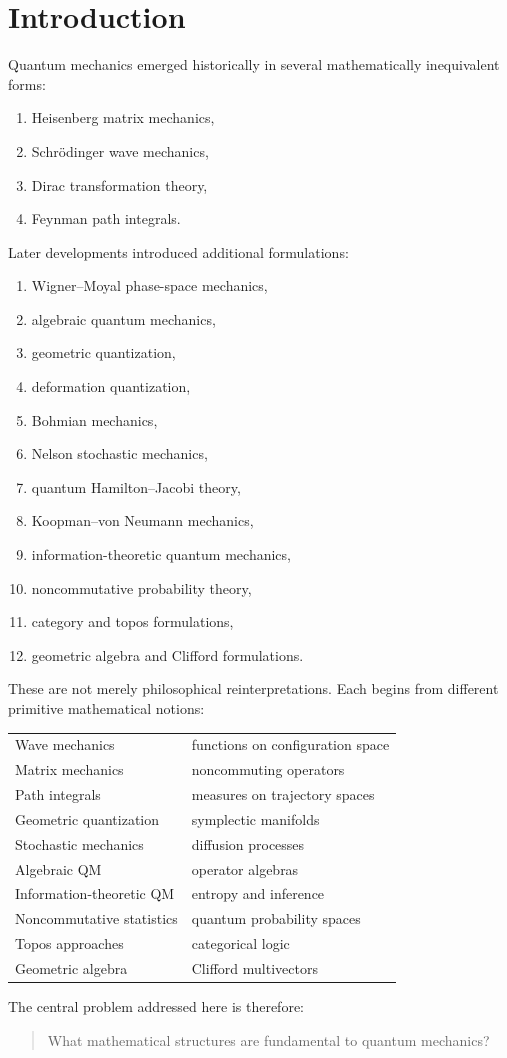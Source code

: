 \section{Introduction}
Quantum mechanics emerged historically in several mathematically inequivalent forms:
\begin{enumerate}
\item Heisenberg matrix mechanics,
\item Schr\"odinger wave mechanics,
\item Dirac transformation theory,
\item Feynman path integrals.
\end{enumerate}
Later developments introduced additional formulations:
\begin{enumerate}
\item Wigner--Moyal phase-space mechanics,
\item algebraic quantum mechanics,
\item geometric quantization,
\item deformation quantization,
\item Bohmian mechanics,
\item Nelson stochastic mechanics,
\item quantum Hamilton--Jacobi theory,
\item Koopman--von Neumann mechanics,
\item information-theoretic quantum mechanics,
\item noncommutative probability theory,
\item category and topos formulations,
\item geometric algebra and Clifford formulations.
\end{enumerate}
These are not merely philosophical reinterpretations. Each begins from
different primitive mathematical notions:
\begin{center}
\begin{tabular}{ll}
Wave mechanics & functions on configuration space \\
Matrix mechanics & noncommuting operators \\
Path integrals & measures on trajectory spaces \\
Geometric quantization & symplectic manifolds \\
Stochastic mechanics & diffusion processes \\
Algebraic QM & operator algebras \\
Information-theoretic QM & entropy and inference \\
Noncommutative statistics & quantum probability spaces \\
Topos approaches & categorical logic \\
Geometric algebra & Clifford multivectors
\end{tabular}
\end{center}
The central problem addressed here is therefore:
\begin{quote}
What mathematical structures are fundamental to quantum mechanics?
\end{quote}
